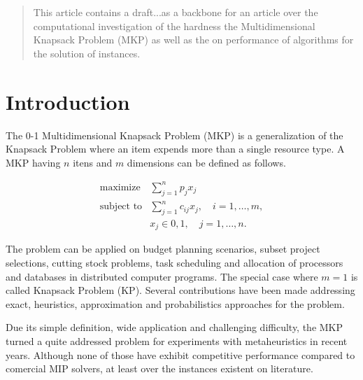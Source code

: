 \documentclass{article}
\author{Marcos Daniel Baroni}
\begin{document}
%
%

\begin{abstract}
This article contains a draft...as a backbone for an article over the
computational investigation of the hardness the Multidimensional Knapsack
Problem (MKP) as well as the on performance of algorithms for the solution of
instances.
\end{abstract}

\section{Introduction}

The 0-1 Multidimensional Knapsack Problem (MKP) is a generalization of the Knapsack
Problem where an item expends more than a single resource type.
A MKP having $n$ itens and $m$ dimensions can be defined as follows.

\begin{align*}
  \text{maximize} & \sum_{j=1}^n p_j x_j \\
  \text{subject to} & \sum_{j=1}^n c_{ij} x_j, \quad i = 1, \ldots, m, \\
   & x_j \in {0, 1}, \quad j = 1, \ldots, n.
\end{align*}

The problem can be applied on budget planning scenarios, subset project
selections, cutting stock problems, task scheduling and allocation of processors
and databases in distributed computer programs.
The special case where $m = 1$ is called Knapsack Problem (KP).
Several contributions have been made addressing exact, heuristics, approximation
and probabilistics approaches for the problem.

Due its simple definition, wide application and challenging
difficulty, the MKP turned a quite addressed problem for experiments
with metaheuristics in recent years.
Although none of those have exhibit competitive performance compared to
comercial MIP solvers, at least over the instances existent on literature.
\end{document}
